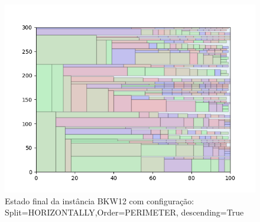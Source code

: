 \begin{figure}[H]
    \centering
    \caption[]{Estado final da instância BKW12 com configuração: Split=HORIZONTALLY,Order=PERIMETER, descending=True}
    \label{fig:bkw12-horizontally-perimeter-true}
    \includegraphics[scale=0.5]{output/figures/bkw/bkw12/horizontally/perimeter/true/000}
\end{figure}